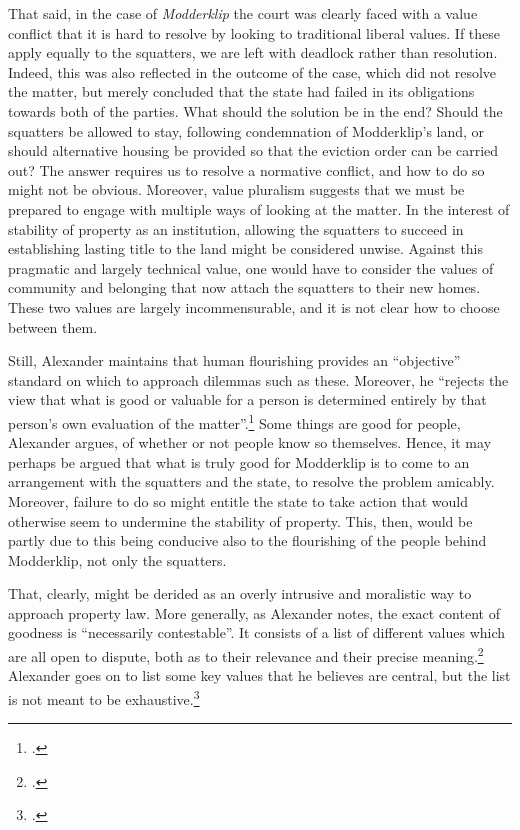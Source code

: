 That said, in the case of {\it Modderklip} the court was clearly faced with a value conflict that it is hard to resolve by looking to traditional liberal values. If these apply equally to the squatters, we are left with deadlock rather than resolution. Indeed, this was also reflected in the outcome of the case, which did not resolve the matter, but merely concluded that the state had failed in its obligations towards both of the parties. What should the solution be in the end? Should the squatters be allowed to stay, following condemnation of Modderklip's land, or should alternative housing be provided so that the eviction order can be carried out? The answer requires us to resolve a normative conflict, and how to do so might not be obvious. Moreover, value pluralism suggests that we must be prepared to engage with multiple ways of looking at the matter. In the interest of stability of property as an institution, allowing the squatters to succeed in establishing lasting title to the land might be considered unwise. Against this pragmatic and largely technical value, one would have to consider the values of community and belonging that now attach the squatters to their new homes. These two values are largely incommensurable, and it is not clear how to choose between them.

Still, Alexander maintains that human flourishing provides an ``objective'' standard on which to approach dilemmas such as these. Moreover, he ``rejects the view that what is good or valuable for a person is determined entirely by that person's own evaluation of the matter''.\footcite[1263]{alexander14} Some things are good for people, Alexander argues,  of whether or not people know so themselves. Hence, it may perhaps be argued that what is truly good for Modderklip is to come to an arrangement with the squatters and the state, to resolve the problem amicably. Moreover, failure to do so might entitle the state to take action that would otherwise seem to undermine the stability of property. This, then, would be partly due to this being conducive also to the flourishing of the people behind Modderklip, not only the squatters.

That, clearly, might be derided as an overly intrusive and moralistic way to approach property law. More generally, as Alexander notes, the exact content of goodness is ``necessarily contestable''. It consists of a list of different values which are all open to dispute, both as to their relevance and their precise meaning.\footcite[1263]{alexander14} Alexander goes on to list some key values that he believes are central, but the list is not meant to be exhaustive.\footcite[1764-1776]{alexander14}

